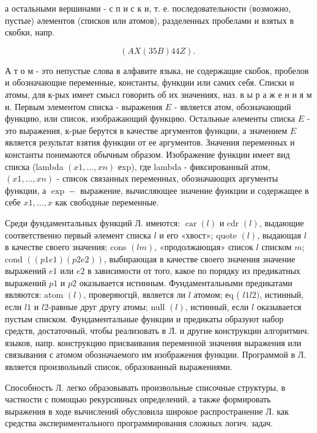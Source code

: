 \documentclass[10pt]{article}
\begin{document}
а остальными вершинами - с п и с к и, т. е. последовательности (возможно, пустые) әлементов (списков или атомов), разделенных пробелами и взятых в скобки, напр.



\[

(A X(35 B) 44 Z) \text {. }

\]



А т о м - это непустые слова в алфавите языка, не содержащие скобок, пробелов и обозначающие переменные, константы, функции или самих себя. Списки и атомы, для к-рых имеет смысл говорить об их значениях, наз. в ы р а ж е н и я м и. Первым элементом списка - выражения $E$ - является атом, обозначающий функцию, или список, изображающий функцию. Остальные әлементы списка $E$ - это выражения, к-рые берутся в качестве аргументов функции, а значением $E$ является результат взятия функции от ее аргументов. Значения переменных и константы понимаются обычным образом. Изображение функции имеет вид списка (lambda $(x 1, \ldots, x n)$ еxp), где lambda - фиксированный атом, $(x 1, \ldots, x n)$ - список связанных переменных, обозначающих аргументы функции, а $\exp -$ выражение, вычисляющее значение функции и содержащее в себе $x 1, \ldots, x$ как свободные переменные.



Среди фундаментальных функций Л. имеются: $\operatorname{car}(l)$ и cdr $(l)$, выдающие соответственно первый әлемент списка $l$ и его «хвост»; quote $(l)$, выдающая $l$ в качестве своего значения; cons $(l m)$, «продолжающая» список $l$ списком $m$; cond $((p 1 e 1)(p 2 e 2))$, выбирающая в качестве своего значения значение выражений $e 1$ или $e 2$ в зависимости от того, какое по порядку из предикатных выражений $p 1$ и $p 2$ оказывается истинным. Фундаментальными предикатами являются: atom $(l)$, проверяюгцй, является ли $l$ атомом; еq ( $l 1 l 2)$, истинный, если $l 1$ и $l 2$-равные друг другу атомы; null $(l)$, истинный, если $l$ оказывается пустым списком. Фундаментальные функции и предикаты образуют набор средств, достаточный, чтобы реализовать в Л. и другие конструкции алгоритмич. языков, напр. конструкцию присваивания переменной значения выражения или связывания с атомом обозначаемого им изображения функции. Программой в Л. является произвольный список, образованный выражениями.



Способность Л. легко образовывать произвольные списочные структуры, в частности с помощью рекурсивных определений, а также формировать выражения в ходе вычислений обусловила широкое распространение Л. как средства әкспериментального программирования сложных логич. задач.
\end{document}
